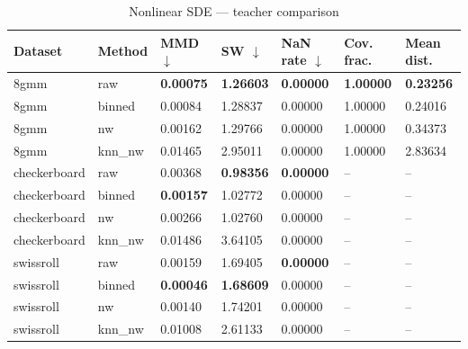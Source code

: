 \begin{table}[ht]
  \centering
  \caption{Nonlinear SDE — teacher comparison}
  \label{tab:nl_teacher_compare}
  \begin{tabular}{lllllll}
    \toprule
    Dataset & Method & MMD $\downarrow$ & SW $\downarrow$ & NaN rate $\downarrow$ & Cov.\,frac. & Mean dist. \\
    \midrule
    8gmm & raw & \textbf{0.00075} & \textbf{1.26603} & \textbf{0.00000} & \textbf{1.00000} & \textbf{0.23256} \\
    8gmm & binned & 0.00084 & 1.28837 & 0.00000 & 1.00000 & 0.24016 \\
    8gmm & nw & 0.00162 & 1.29766 & 0.00000 & 1.00000 & 0.34373 \\
    8gmm & knn_nw & 0.01465 & 2.95011 & 0.00000 & 1.00000 & 2.83634 \\
    \midrule
    checkerboard & raw & 0.00368 & \textbf{0.98356} & \textbf{0.00000} & -- & -- \\
    checkerboard & binned & \textbf{0.00157} & 1.02772 & 0.00000 & -- & -- \\
    checkerboard & nw & 0.00266 & 1.02760 & 0.00000 & -- & -- \\
    checkerboard & knn_nw & 0.01486 & 3.64105 & 0.00000 & -- & -- \\
    \midrule
    swissroll & raw & 0.00159 & 1.69405 & \textbf{0.00000} & -- & -- \\
    swissroll & binned & \textbf{0.00046} & \textbf{1.68609} & 0.00000 & -- & -- \\
    swissroll & nw & 0.00140 & 1.74201 & 0.00000 & -- & -- \\
    swissroll & knn_nw & 0.01008 & 2.61133 & 0.00000 & -- & -- \\
    \bottomrule
  \end{tabular}
\end{table}
